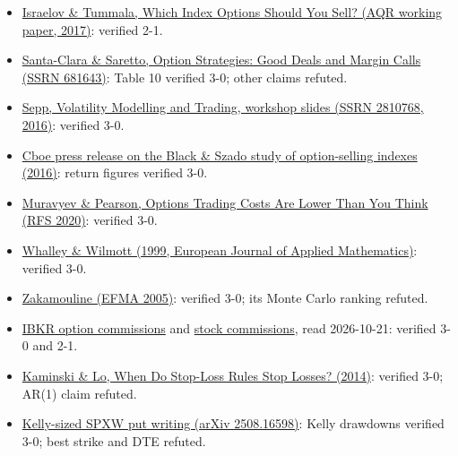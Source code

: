 \documentclass{article}
\begin{document}
\begin{itemize}

\item \href{https://www.aqr.com/Insights/Research/Working-Paper/Which-Index-Options-Should-You-Sell}{Israelov \& Tummala, Which Index Options Should You Sell? (AQR working paper, 2017)}: verified 2-1.

\item \href{https://papers.ssrn.com/abstract=681643}{Santa-Clara \& Saretto, Option Strategies: Good Deals and Margin Calls (SSRN 681643)}: Table 10 verified 3-0; other claims refuted.

\item \href{https://papers.ssrn.com/sol3/papers.cfm?abstract_id=2810768}{Sepp, Volatility Modelling and Trading, workshop slides (SSRN 2810768, 2016)}: verified 3-0.

\item \href{https://ir.cboe.com/news/news-details/2016/Study-Analyzes-Performance-of-CBOE-SP-500-SPX-Options-Selling-Indexes-02-23-2016/default.aspx}{Cboe press release on the Black \& Szado study of option-selling indexes (2016)}: return figures verified 3-0.

\item \href{https://ideas.repec.org/a/oup/rfinst/v33y2020i11p4973-5014..html}{Muravyev \& Pearson, Options Trading Costs Are Lower Than You Think (RFS 2020)}: verified 3-0.

\item \href{https://users.ox.ac.uk/~ofrcinfo/pages_mfpapers/1999mf09.htm}{Whalley \& Wilmott (1999, European Journal of Applied Mathematics)}: verified 3-0.

\item \href{https://www.efmaefm.org/0efmameetings/EFMA\%20ANNUAL\%20MEETINGS/2005-Milan/papers/284-zakamouline_paper.pdf}{Zakamouline (EFMA 2005)}: verified 3-0; its Monte Carlo ranking refuted.

\item \href{https://www.interactivebrokers.com/en/pricing/commissions-options.php}{IBKR option commissions} and \href{https://www.interactivebrokers.com/en/pricing/commissions-stocks.php}{stock commissions}, read 2026-10-21: verified 3-0 and 2-1.

\item \href{https://dspace.mit.edu/handle/1721.1/114876}{Kaminski \& Lo, When Do Stop-Loss Rules Stop Losses? (2014)}: verified 3-0; AR(1) claim refuted.

\item \href{https://arxiv.org/abs/2508.16598}{Kelly-sized SPXW put writing (arXiv 2508.16598)}: Kelly drawdowns verified 3-0; best strike and DTE refuted.


\end{itemize}
\end{document}
